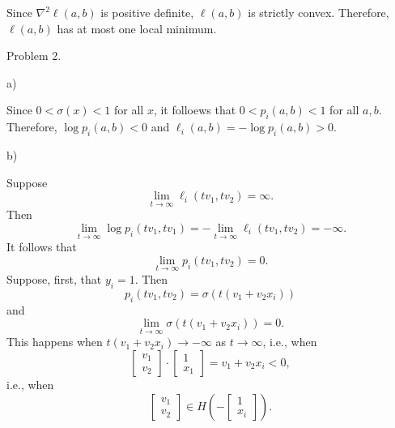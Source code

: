 \documentclass[12pt]{amsart}
\begin{document}
    Since $\nabla^2\ell(a, b)$ is positive definite, $\ell(a, b)$ is strictly convex.
    Therefore, $\ell(a, b)$ has at most one local minimum.


    Problem 2.

    a)

    Since $0<\sigma(x)<1$ for all $x$, it folloews that $0<p_i(a, b)<1$ for all $a, b$.
    Therefore, $\log p_i(a, b)<0$ and $\ell_i(a, b)=-\log p_i(a, b)>0$.

    b)

    Suppose $$\lim_{t\to\infty}\ell_i(tv_1, tv_2)=\infty.$$
    Then
    \[
        \lim_{t\to\infty}\log p_i(tv_1, tv_1) = -\lim_{t\to\infty}\ell_i(tv_1, tv_2) = -\infty.
    \]
    It follows that
    \[
        \lim_{t\to\infty} p_i(tv_1, tv_2)= 0.
    \]
    Suppose, first, that $y_i=1$. Then
    $$p_i(tv_1, tv_2) = \sigma(t(v_1+v_2x_i))$$
    and
    \[
    \lim_{t\to\infty}\sigma(t(v_1+v_2x_i)) = 0.
    \]
    This happens when $t(v_1+v_2x_i)\to-\infty$ as $t\to\infty$, i.e., when
    \[
        \begin{bmatrix}
            v_1\\v_2
        \end{bmatrix}\cdot\begin{bmatrix}
            1\\x_1
        \end{bmatrix} = v_1+v_2x_i < 0,
    \]
    i.e., when
    \[
    \begin{bmatrix}
        v_1\\v_2
    \end{bmatrix}
    \in H\left(-
    \begin{bmatrix}
    1\\x_i
    \end{bmatrix}
    \right).
    \]
\end{document}
